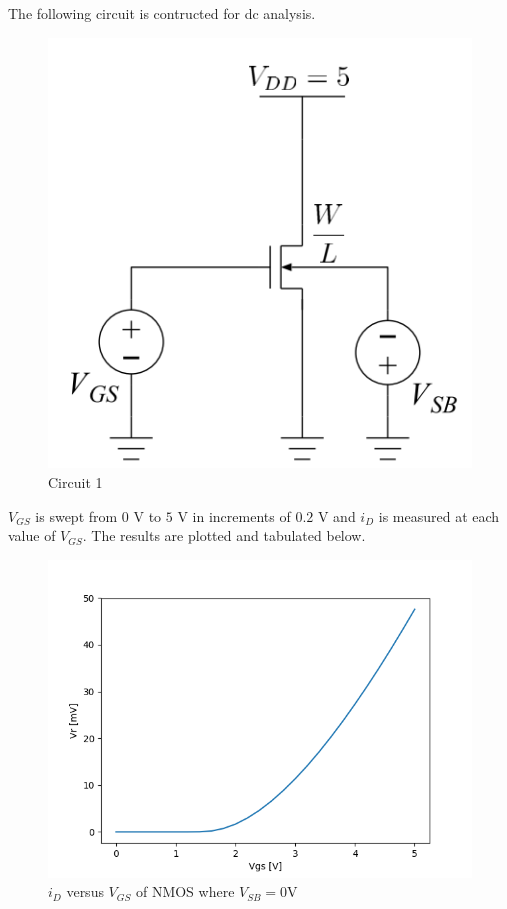 The following circuit is contructed for dc analysis.

\FloatBarrier

\begin{figure}[h!]
	\centering
	\includegraphics[scale=0.75]{./images/circuit_1.PNG}
	\caption{Circuit 1}
	\label{fig:circuit_1}
\end{figure}

\FloatBarrier

$V_{GS}$ is swept from $0$ \si{\volt} to $5$ \si{\volt} in increments of $0.2$ \si{\volt} and $i_D$ is measured at each value of $V_{GS}$. 
The results are plotted and tabulated below.

\FloatBarrier

\begin{figure}[h!]
	\centering
	\includegraphics[scale=0.75]{./images/data_1.PNG}
	\caption{$i_{D}$ versus $V_{GS}$ of NMOS where $V_{SB}= 0$\si{\volt}}
	\label{fig:data_1}
\end{figure}


